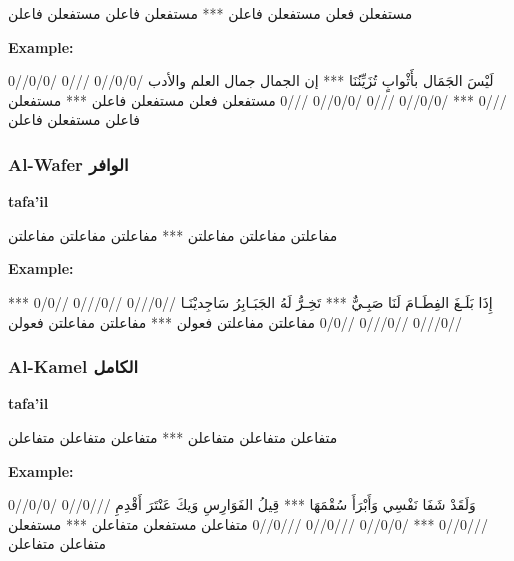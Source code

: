 \begin{Arabic}
	\begin{traditionalpoem*}
مستفعلن فعلن مستفعلن فاعلن *** مستفعلن فاعلن مستفعلن فاعلن
	\end{traditionalpoem*}
      \end{Arabic}
\textbf{Example:}
\begin{Arabic}
	\begin{traditionalpoem*}
لَيْسَ الجَمَال بأَثْوابٍ تُزَيِّنُنَا    ***	إن الجمال جمال العلم والأدب
/0/0//0 ///0 /0/0//0 ///0   ***  /0/0//0 ///0 /0/0//0 ///0
مستفعلن فعلن مستفعلن فاعلن  *** مستفعلن فاعلن مستفعلن فاعلن
	\end{traditionalpoem*}
      \end{Arabic}

\subsubsection{Al-Wafer \textarabic{الوافر}}
\textbf{tafa'il}
\begin{Arabic}
	\begin{traditionalpoem*}
          مفاعلتن مفاعلتن مفاعلتن *** مفاعلتن مفاعلتن مفاعلتن
	\end{traditionalpoem*}
      \end{Arabic}
\textbf{Example:}
\begin{Arabic}
  \begin{traditionalpoem*}
    إِذَا بَلَـغَ الفِطَـامَ لَنَا صَبِـيٌّ *** تَخِـرُّ لَهُ الجَبَـابِرُ سَاجِديْنَـا
    //0///0 //0///0 //0/0 ***  //0///0 //0///0 //0/0
    مفاعلتن مفاعلتن فعولن  *** مفاعلتن مفاعلتن فعولن
	\end{traditionalpoem*}
      \end{Arabic}


\subsubsection{Al-Kamel \textarabic{الكامل}}
\textbf{tafa'il}

\begin{Arabic}
	\begin{traditionalpoem*}
متفاعلن متفاعلن متفاعلن *** متفاعلن متفاعلن متفاعلن
	\end{traditionalpoem*}
      \end{Arabic}
\textbf{Example:}
\begin{Arabic}
	\begin{traditionalpoem*}
وَلَقَدْ شَفَا نَفْسِي وَأَبْرَأَ سُقْمَهَا *** قِيلُ الفَوَارِسِ وَيكَ عَنْتَرَ أَقْدِمِ
///0//0 /0/0//0 ///0//0 ***  /0/0//0 ///0//0 ///0//0
متفاعلن مستفعلن متفاعلن *** مستفعلن متفاعلن متفاعلن
	\end{traditionalpoem*}
      \end{Arabic}

